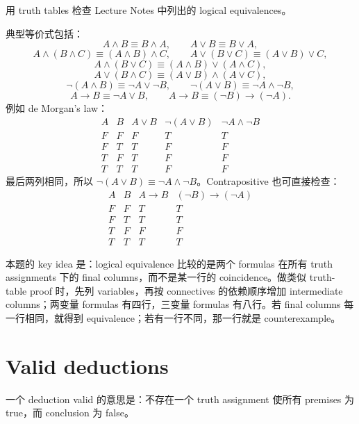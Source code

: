 \begin{exerciseblock}
用 truth tables 检查 Lecture Notes 中列出的 logical equivalences。
\end{exerciseblock}

\begin{solution}
典型等价式包括：
\[
A\land B\equiv B\land A,\qquad A\lor B\equiv B\lor A,
\]
\[
A\land(B\land C)\equiv(A\land B)\land C,\qquad
A\lor(B\lor C)\equiv(A\lor B)\lor C,
\]
\[
A\land(B\lor C)\equiv(A\land B)\lor(A\land C),
\]
\[
A\lor(B\land C)\equiv(A\lor B)\land(A\lor C),
\]
\[
\lnot(A\land B)\equiv\lnot A\lor\lnot B,\qquad
\lnot(A\lor B)\equiv\lnot A\land\lnot B,
\]
\[
A\to B\equiv\lnot A\lor B,\qquad
A\to B\equiv(\lnot B)\to(\lnot A).
\]
例如 de Morgan's law：
\[
\begin{array}{cc|c|c|c}
A&B&A\lor B&\lnot(A\lor B)&\lnot A\land\lnot B\\
\hline
F&F&F&T&T\\
F&T&T&F&F\\
T&F&T&F&F\\
T&T&T&F&F
\end{array}
\]
最后两列相同，所以 \(\lnot(A\lor B)\equiv\lnot A\land\lnot B\)。Contrapositive 也可直接检查：
\[
\begin{array}{cc|cc}
A&B&A\to B&(\lnot B)\to(\lnot A)\\
\hline
F&F&T&T\\
F&T&T&T\\
T&F&F&F\\
T&T&T&T
\end{array}
\]
\end{solution}

\begin{explanation}
本题的 key idea 是：logical equivalence 比较的是两个 formulas 在所有 truth assignments 下的 final columns，而不是某一行的 coincidence。做类似 truth-table proof 时，先列 variables，再按 connectives 的依赖顺序增加 intermediate columns；两变量 formulas 有四行，三变量 formulas 有八行。若 final columns 每一行相同，就得到 equivalence；若有一行不同，那一行就是 counterexample。
\end{explanation}

\section{Valid deductions}

一个 deduction valid 的意思是：不存在一个 truth assignment 使所有 premises 为 true，而 conclusion 为 false。


